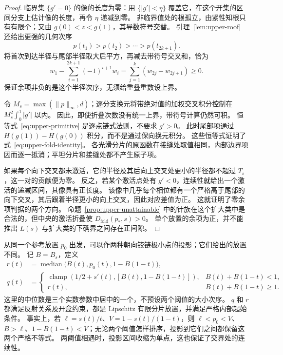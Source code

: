 \begin{proof}
临界集 $\{g'=0\}$ 的像的长度为零：用 $\{|g'|<\eta\}$ 覆盖它，在这个开集的区间分支上估计像的长度，再令 $\eta$ 递减到零。
非临界值处的根孤立，由紧性知根只有有限个；又由 $g(0)<z<g(1)$，其导数符号交替。
引理~\ref{lem:upper-roof} 还给出更强的几何次序
\[
 p(t_1)>p(t_2)>\cdots>p(t_{2k+1}).
\]
将首次到达半径与尾部半径取大后平方，再减去带符号交叉和，恰为
\[
 w_1-\sum_{i=1}^{2k+1}(-1)^{i+1}w_i
              =\sum_{j=1}^k(w_{2j}-w_{2j+1})\ge0.
\]
保证余项非负的是这个半径次序，无须给重叠重数设上界。

令 $M_s=\max(\|p\|_\infty,d)$；逐分支换元将带绝对值的加权交叉积分控制在 $M_s^2\int_0^1|g'|$ 以内。
因此，即使折叠次数没有统一上界，带符号计算仍然可积。
恒等式~\eqref{eq:upper-primitive} 是逐点链式法则，不要求 $g'>0$。
此时尾部项通过 $H(g(1))-H(g(0))$ 积分，而不是通过保向换元积分。
这些恒等式证明了式~\eqref{eq:upper-fold-identity}。
各光滑分片的原函数在接缝处取值相同，内部边界项因而逐一抵消；平坦分片和接缝处都不产生原子项。

如果每个向下交叉都未激活，它的半径及其后向上交叉处更小的半径都不超过 $T_s$，这一对的贡献便为零。
反之，若某个激活点处有 $g'<0$，连续性就给出一个激活的递减区间，其像具有正长度。
该像中几乎每个相位都有一个严格高于尾部的向下交叉，其后跟着半径更小的向上交叉，因此对应差值为正。
这就证明了零余项判据的两个方向。
命题~\ref{prop:upper-unattainable} 中的针族在这个扩大类中是合法的，但中央的激活折叠使 $D_{\mathrm{fold}}(p_*,s)>0$。
单个放置的余项为正，并不能推出 $L(s)$ 与扩大类的下确界之间存在正间隙。
\end{proof}

从同一个参考放置 $p_0$ 出发，可以作两种朝向铰链极小点的投影；它们给出的放置不同。
记 $B=B_s$，定义
\begin{align}
 r(t)&=\operatorname{median}\bigl(B(t),p_0(t),1-B(1-t)\bigr),\label{eq:upper-band}\\
 q(t)&=\begin{cases}
 \operatorname{clamp}(1/2+s'(t),[B(t),1-B(1-t)]),&B(t)+B(1-t)<1,\\
 r(t),&B(t)+B(1-t)\ge1.
 \end{cases}\label{eq:upper-completed}
\end{align}
这里的中位数是三个实数参数中居中的一个，不预设两个阈值的大小次序。
$q$ 和 $r$ 都满足反射关系及开盒约束，都是 Lipschitz 有限分片放置，并满足严格内部起始条件。
事实上，若 $\ell=s(t)/t$、$V=1-s(t)/(1-t)$，则 $\ell<p_0<V$、$B>\ell$、$1-B(1-t)<V$；无论两个阈值怎样排序，投影到它们之间都保留这两个严格不等式。
两阈值相遇时，投影区间收缩为单点，这也保证了交界处的连续性。

